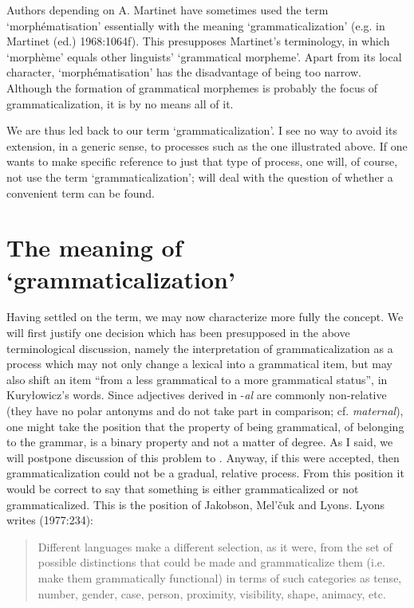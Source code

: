 Authors depending on A. Martinet have sometimes used the term ‘morphématisation’ essentially with the meaning ‘grammaticalization’ (e.g. in Martinet (ed.) 1968:1064f). This presupposes Martinet's terminology, in which ‘morphème’ equals other linguists' ‘grammatical morpheme’. Apart from its local character, ‘morphématisation’ has the disadvantage of being too narrow. Although the formation of grammatical morphemes is probably the focus of grammaticalization, it is by no means all of it.

We are thus led back to our term ‘grammaticalization’. I see no way to avoid its extension, in a generic sense, to processes such as the one illustrated above. If one wants to make specific reference to just that type of process, one will, of course, not use the term ‘grammaticalization’;  will deal with the question of whether a convenient term can be found.

\section{The meaning of ‘grammaticalization’}

Having settled on the term, we may now characterize more fully the concept. We will first justify one decision which has been presupposed in the above terminological discussion, namely the interpretation of grammaticalization as a process which may not only change a lexical into a grammatical item, but may also shift an item “from a less grammatical to a more grammatical status”, in Kuryłowicz's words. Since adjectives derived in -\textit{al} are commonly non-relative (they have no polar antonyms and do not take part in comparison; cf. \textit{maternal}), one might take the position that the property of being grammatical, of belonging to the grammar, is a binary property and not a matter of degree. As I said, we will postpone discussion of this problem to . Anyway, if this were accepted, then grammaticalization could not be a gradual, relative process. From this position it would be correct to say that something is either grammaticalized or not grammaticalized. This is the position of Jakobson, Mel'čuk and Lyons. Lyons writes (1977:234):

\begin{quote}
Different languages make a different selection, as it were, from the set of possible distinctions that could be made and grammaticalize them (i.e. make them grammatically functional) in terms of such categories as tense, number, gender, case, person, proximity, visibility, shape, animacy, etc.
\end{quote}

